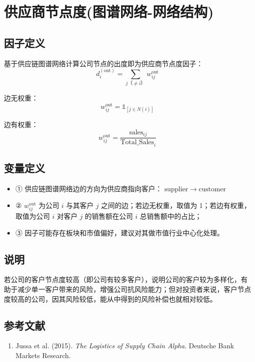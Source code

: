 \documentclass{article}
\begin{document}
\section{供应商节点度(图谱网络-网络结构)}

\subsection{因子定义}
基于供应链图谱网络计算公司节点的出度即为供应商节点度因子：
\begin{equation}
    d_i^{(\mathrm{out})} = \sum_{j （\neq i）} w_{ij}^{\mathrm{out}}
\end{equation}

边无权重：
\begin{equation}
    w_{ij}^{\mathrm{out}} = \mathbb{1}_{[j \in N(i)]}
\end{equation}

边有权重：
\begin{equation}
    w_{ij}^{\mathrm{out}} = \frac{\mathrm{sales}_{ij}}{\mathrm{Total\_Sales}_i}
\end{equation}

\subsection{变量定义}
\begin{itemize}
    \item ① 供应链图谱网络边的方向为供应商指向客户： \(\mathrm{supplier} \rightarrow \mathrm{customer}\)
    \item ② \( w_{ij}^{\mathrm{out}} \) 为公司 \( i \) 与其客户 \( j \) 之间的边；若边无权重，取值为 1；若边有权重，取值为公司 \( i \) 对客户 \( j \) 的销售额在公司 \( i \) 总销售额中的占比；
    \item ③ 因子可能存在板块和市值偏好，建议对其做市值行业中心化处理。
\end{itemize}

\subsection{说明}
若公司的客户节点度较高（即公司有较多客户），说明公司的客户较为多样化，有助于减少单一客户带来的风险，增强公司抗风险能力；但对投资者来说，客户节点度较高的公司，因其风险较低，能从中得到的风险补偿也就相对较低。

\subsection{参考文献}
\begin{enumerate}
    \item Jussa et al. (2015). \textit{The Logistics of Supply Chain Alpha}. Deutsche Bank Markets Research.
\end{enumerate}
\end{document}
